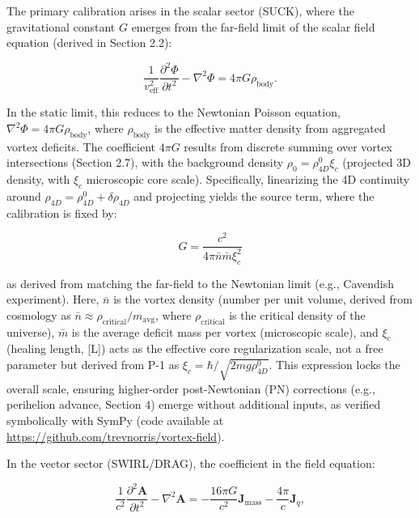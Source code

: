 The primary calibration arises in the scalar sector (SUCK), where the gravitational constant $G$ emerges from the far-field limit of the scalar field equation (derived in Section 2.2):

\begin{equation}
\frac{1}{v_{\text{eff}}^2} \frac{\partial^2 \Phi}{\partial t^2} - \nabla^2 \Phi = 4\pi G \rho_{\text{body}}.
\end{equation}

In the static limit, this reduces to the Newtonian Poisson equation, $\nabla^2 \Phi = 4\pi G \rho_{\text{body}}$, where $\rho_{\text{body}}$ is the effective matter density from aggregated vortex deficits. The coefficient $4\pi G$ results from discrete summing over vortex intersections (Section 2.7), with the background density $\rho_0 = \rho_{4D}^0 \xi_c$ (projected 3D density, with $\xi_c$ microscopic core scale). Specifically, linearizing the 4D continuity around $\rho_{4D} = \rho_{4D}^0 + \delta \rho_{4D}$ and projecting yields the source term, where the calibration is fixed by:

\begin{equation}
G = \frac{c^2}{4\pi \bar{n} \bar{m} \xi_c^2}
\end{equation}

as derived from matching the far-field to the Newtonian limit (e.g., Cavendish experiment). Here, $\bar{n}$ is the vortex density (number per unit volume, derived from cosmology as $\bar{n} \approx \rho_{\text{critical}} / m_{\text{avg}}$, where $\rho_{\text{critical}}$ is the critical density of the universe), $\bar{m}$ is the average deficit mass per vortex (microscopic scale), and $\xi_c$ (healing length, [L]) acts as the effective core regularization scale, not a free parameter but derived from P-1 as $\xi_c = \hbar / \sqrt{2 m g \rho_{4D}^0}$. This expression locks the overall scale, ensuring higher-order post-Newtonian (PN) corrections (e.g., perihelion advance, Section 4) emerge without additional inputs, as verified symbolically with SymPy (code available at \url{https://github.com/trevnorris/vortex-field}).

In the vector sector (SWIRL/DRAG), the coefficient in the field equation:

\begin{equation}
\frac{1}{c^2} \frac{\partial^2 \mathbf{A}}{\partial t^2} - \nabla^2 \mathbf{A} = -\frac{16\pi G}{c^2} \mathbf{J}_{\text{mass}} - \frac{4\pi}{c} \mathbf{J}_q,
\end{equation}

